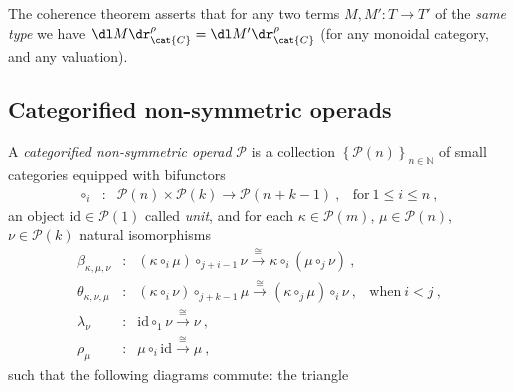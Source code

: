 The coherence theorem asserts that for any two terms $M,M':T\rightarrow T'$  of the {\em same type} we have $\dl M\dr^\rho_{\cat{C}}=\dl M'\dr^\rho_{\cat{C}}$  (for any monoidal category, and any valuation).


\subsection{Categorified non-symmetric operads}

\begin{definition} A \emph{categorified non-symmetric operad} $\mathcal{P}$ is a collection $\left\{  \mathcal{P}(n)  \right\}_{n\in \mathbb{N}}$ of small categories equipped with bifunctors  
$$ \begin{array}{clll}
\circ_i&\colon& \mathcal{P}(n) \times
                  \mathcal{P}(k)
                  \longrightarrow \mathcal{P}(n+k-1) \ ,
                  & \text{for}\ 1 \leq i \leq n \ ,
\end{array}  $$
an object $\mathrm{id} \in \mathcal{P}(1)$ called \emph{unit}, and for each $\kappa \in \mathcal{P}(m)$,  $\mu \in \mathcal{P}(n)$, $\nu \in \mathcal{P}(k)$ natural isomorphisms 
$$ \begin{array}{clll}
    \beta_{\kappa,\mu,\nu}&\colon& 
    (\kappa \circ_i \mu) \circ_{j+i-1} \nu  \overset{\cong}{\longrightarrow} \kappa \circ_i (\mu \circ_j \nu) \ , &  \\
    \theta_{\kappa,\nu,\mu}&\colon& 
    (\kappa \circ_i \nu) \circ_{j+k-1} \mu 
    \overset{\cong}{\longrightarrow} (\kappa \circ_j \mu) \circ_i \nu \ , & \text{when}\ i < j \ , \\
    \lambda_\nu &\colon& 
    \mathrm{id} \circ_1 \nu \overset{\cong}{\longrightarrow} \nu \ , & \\
    \rho_\mu &\colon& 
    \mu \circ_i \mathrm{id} \overset{\cong}{\longrightarrow} \mu \ , & 
\end{array}  $$
such that the following diagrams commute: the triangle \\
\begin{center}
\end{center}
\end{definition}
